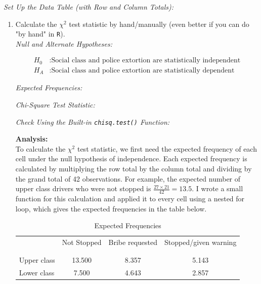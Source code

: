 \documentclass[12pt,letterpaper]{article}
\begin{document}
\newpage

	\textit{Set Up the Data Table (with Row and Column Totals):}
	

\begin{enumerate}
	
	\item [(a)]
	Calculate the $\chi^2$ test statistic by hand/manually (even better if you can do "by hand" in \texttt{R}).\\
	
	\textit{Null and Alternate Hypotheses:}
	
	\[
	\begin{aligned}
		H_0 &: \text{Social class and police extortion are statistically independent} \\
		H_A &: \text{Social class and police extortion are statistically dependent}
	\end{aligned}
	\]
	
	\textit{Expected Frequencies:}
	
	
	\textit{Chi-Square Test Statistic:}
	
	
	\textit{Check Using the Built-in \texttt{chisq.test()} Function:}
	
	
	\textbf{Analysis:}\\
	To calculate the $\chi^2$ test statistic, we first need the expected frequency of each cell under the null hypothesis of independence. Each expected frequency is calculated by multiplying the row total by the column total and dividing by the grand total of 42 observations. For example, the expected number of upper class drivers who were not stopped is $\frac{27 \times 21}{42} = 13.5$. I wrote a small function for this calculation and applied it to every cell using a nested for loop, which gives the expected frequencies in the table below.
	
	\begin{table}[H]
		\centering
		\caption{\footnotesize Expected Frequencies}
		\begin{tabular}{l | c c c }
			& Not Stopped & Bribe requested & Stopped/given warning \\
			\\[-1.8ex] 
			\hline \\[-1.8ex]
			Upper class & 13.500 & 8.357 & 5.143 \\
			Lower class & 7.500 & 4.643 & 2.857 \\
			\hline
		\end{tabular}
	\end{table}
	

\end{enumerate}
\end{document}
